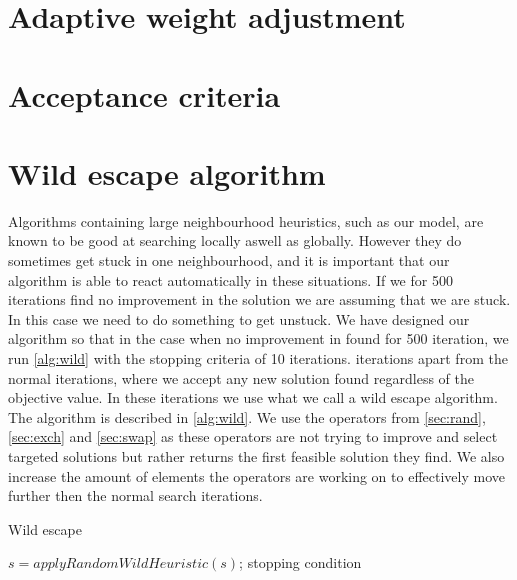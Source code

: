\documentclass[../main.tex]{subfiles}
\begin{document}
\section{Adaptive weight adjustment}
\label{sec:weight}

\section{Acceptance criteria}
\label{sec:accept}

\section{Wild escape algorithm}
\label{sec:wild}
Algorithms containing large neighbourhood heuristics, such as our model, are known to be good at searching locally aswell as globally. 
However they do sometimes get stuck in one neighbourhood, and it is important that our algorithm is able to react automatically in these situations.
If we for 500 iterations find no improvement in the solution we are assuming that we are stuck. In this case we need to do something to get unstuck. 
We have designed our algorithm so that in the case when no improvement in found for 500 iteration, we run \cref{alg:wild} with the stopping criteria of 10 iterations. iterations apart from the normal iterations, where we accept any new solution found regardless of the objective value. 
In these iterations we use what we call a wild escape algorithm.
The algorithm is described in \cref{alg:wild}.
We use the operators from \cref{sec:rand}, \cref{sec:exch} and \cref{sec:swap} as these operators are not trying to improve and select targeted solutions but rather returns the first feasible solution they find. 
We also increase the amount of elements the operators are working on to effectively move further then the normal search iterations. 

\begin{algorithm}
    \label{alg:wild}
    \caption{Wild escape}
    \begin{algorithmic}[1]
        \Repeat
        \State $s=applyRandomWildHeuristic(s)$;
        \Until stopping condition
        \EndFunction
    \end{algorithmic}
\end{algorithm}

\biblio                                                         
\end{document}
